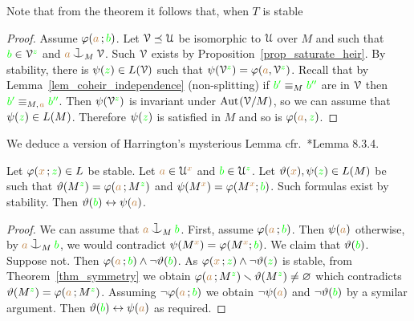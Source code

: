 Note that from the theorem it follows that, when $T$ is stable


\vspace*{-\parskip}
\begin{proof}
  Assume $\varphi({\color{brown} a}\,;{\color{green} b})$.
  Let $\EuScript V\preceq\EuScript U$ be isomorphic to $\EuScript U$ over $M$ and such that ${\color{green} b}\in\EuScript V^{\color{green} z}$ and ${\mr a}\cnonfork_M\V$. Such $\EuScript V$ exists by Proposition~\ref{prop_saturate_heir}.
  By stability, there is $\psi({\color{green} z})\in L(\EuScript V)$ such that $\psi(\EuScript V^{\color{green} z})=\varphi({\color{brown} a},\EuScript V^{\color{green} z})$.
  Recall that by Lemma~\ref{lem_coheir_independence} (non-splitting) if ${\color{green} b'}\equiv_M{\color{green} b''}$ are in $\EuScript V$ then ${\color{green} b'}\equiv_{M,\kern.2ex{\color{brown} a}}{\color{green} b''}$.
  Then $\psi(\EuScript V^{\color{green} z})$ is invariant under ${\rm Aut\kern.15ex}(\EuScript V/M)$, so we can assume that $\psi({\color{green} z})\in L(M)$.
  Therefore $\psi({\color{green} z})$ is satisfied in $M$ and so is $\varphi({\color{brown} a},{\color{green} z})$.
\end{proof}

We deduce a version of Harrington's mysterious Lemma cfr.~\cite{TZ}*{Lemma 8.3.4}.

\begin{corollary}\label{corol_harrington0}
  Let $\varphi({\color{brown} x}\,;{\color{green} z})\in L$ be stable.
  Let ${\color{brown} a}\in\EuScript U^{\color{brown} x}$ and ${\color{green} b}\in\EuScript U^{\color{green} z}$.
  Let $\vartheta({\color{brown} x}),\psi({\color{green} z})\in L(M)$ be such that $\vartheta(M^{\color{green} z})=\varphi({\color{brown} a}\,;M^{\color{green} z})$ and $\psi(M^{\color{brown} x})=\varphi(M^{\color{brown} x};{\color{green} b})$.
  Such formulas exist by stability.
  Then $\vartheta({\color{green} b})\leftrightarrow\psi({\color{brown} a})$.
\end{corollary}

\begin{proof}
  We can assume that ${\mr a}\cnonfork_M{\gr b}$.
  First, assume $\varphi({\color{brown} a}\,;{\color{green} b})$.
  Then $\psi({\color{brown} a})$ otherwise, by ${\mr a}\cnonfork_M{\gr b}$, we would contradict $\psi(M^{\color{brown} x})=\varphi(M^{\color{brown} x};{\color{green} b})$.
  We claim that $\vartheta({\color{green} b})$.
  Suppose not.
  Then $\varphi({\color{brown} a}\,;{\color{green} b})\wedge\neg\vartheta({\color{green} b})$.
  As $\varphi({\color{brown} x}\,;{\color{green} z})\wedge\neg\vartheta({\color{green} z})$ is stable, from Theorem~\ref{thm_symmetry} we obtain $\varphi({\color{brown} a}\,;M^{\color{green} z})\smallsetminus\vartheta(M^{\color{green} z})\neq\varnothing$ which contradicts  $\vartheta(M^{\color{green} z})=\varphi({\color{brown} a}\,;M^{\color{green} z})$.
  Assuming $\neg\varphi({\color{brown} a}\,;{\color{green} b})$ we obtain $\neg\psi({\color{brown} a})$ and $\neg\vartheta({\color{green} b})$ by a symilar argument.
  Then $\vartheta({\color{green} b})\leftrightarrow\psi({\color{brown} a})$ as required.
\end{proof}


